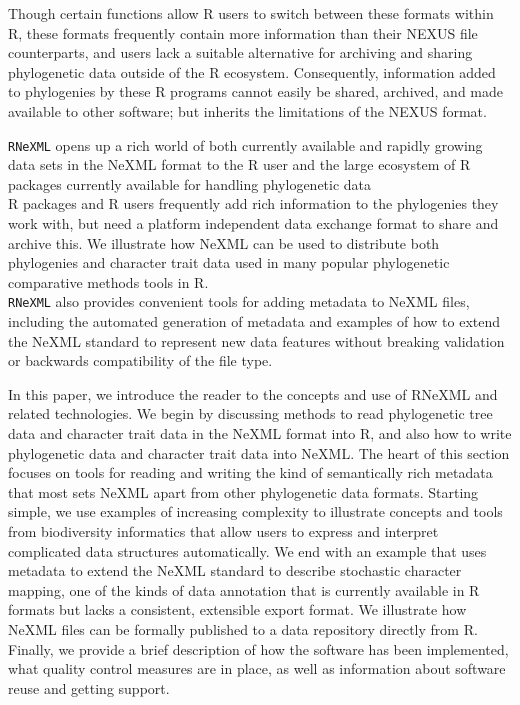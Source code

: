 \documentclass[author-year, review, 11pt]{components/elsarticle} %
\begin{document}
Though certain functions allow R users to switch between these formats
within R, these formats frequently contain more information than their
NEXUS file counterparts, and users lack a suitable alternative for
archiving and sharing phylogenetic data outside of the R ecosystem.
Consequently, information added to phylogenies by these R programs
cannot easily be shared, archived, and made available to other software;
but inherits the limitations of the NEXUS format.

\texttt{RNeXML} opens up a rich world of both currently available and
rapidly growing data sets in the NeXML format to the R user and the
large ecosystem of R packages currently available for handling
phylogenetic data\\R packages and R users frequently add rich
information to the phylogenies they work with, but need a platform
independent data exchange format to share and archive this. We
illustrate how NeXML can be used to distribute both phylogenies and
character trait data used in many popular phylogenetic comparative
methods tools in R.\\\texttt{RNeXML} also provides convenient tools for
adding metadata to NeXML files, including the automated generation of
metadata and examples of how to extend the NeXML standard to represent
new data features without breaking validation or backwards compatibility
of the file type.

In this paper, we introduce the reader to the concepts and use of RNeXML
and related technologies. We begin by discussing methods to read
phylogenetic tree data and character trait data in the NeXML format into
R, and also how to write phylogenetic data and character trait data into
NeXML. The heart of this section focuses on tools for reading and
writing the kind of semantically rich metadata that most sets NeXML
apart from other phylogenetic data formats. Starting simple, we use
examples of increasing complexity to illustrate concepts and tools from
biodiversity informatics that allow users to express and interpret
complicated data structures automatically. We end with an example that
uses metadata to extend the NeXML standard to describe stochastic
character mapping, one of the kinds of data annotation that is currently
available in R formats but lacks a consistent, extensible export format.
We illustrate how NeXML files can be formally published to a data
repository directly from R. Finally, we provide a brief description of
how the software has been implemented, what quality control measures are
in place, as well as information about software reuse and getting
support.
\end{document}
